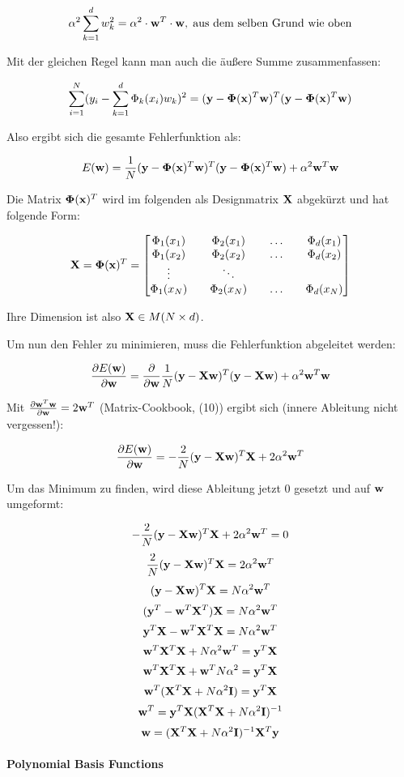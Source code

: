 $$ \alpha^2 \sum_{k=1}^d w_k^2 = \alpha^2 \cdot \mathbf{w}^T \cdot \mathbf{w}, \; \text{aus dem selben Grund wie oben} $$

Mit der gleichen Regel kann man auch die äußere Summe zusammenfassen:

$$ \sum_{i=1}^N (y_i - \sum_{k=1}^{d} \Phi_k(x_i) w_k)^2 = (\mathbf{y} - \mathbf{\Phi}(\mathbf{x})^T \mathbf{w})^T (\mathbf{y} - \mathbf{\Phi}(\mathbf{x})^T \mathbf{w}) $$

Also ergibt sich die gesamte Fehlerfunktion als:

$$ E(\mathbf{w}) = \frac{1}{N} (\mathbf{y} - \mathbf{\Phi}(\mathbf{x})^T \mathbf{w})^T (\mathbf{y} - \mathbf{\Phi}(\mathbf{x})^T \mathbf{w}) + \alpha^2 \mathbf{w}^T \mathbf{w} $$

Die Matrix $ \mathbf{\Phi}(\mathbf{x})^T $ wird im folgenden als Designmatrix $ \mathbf{X} $ abgekürzt und hat folgende Form:

$$ \mathbf{X} = \mathbf{\Phi}(\mathbf{x})^T = \begin{bmatrix} \Phi_1(x_1) && \Phi_2(x_1) && \hdots && \Phi_d(x_1) \\  \Phi_1(x_2) && \Phi_2(x_2) && \hdots && \Phi_d(x_2) \\ \vdots && \ddots \\ \Phi_1(x_N) && \Phi_2(x_N) && \hdots && \Phi_d(x_N) \end{bmatrix} $$

Ihre Dimension ist also $ \mathbf{X} \in M(N \times d) $.

Um nun den Fehler zu minimieren, muss die Fehlerfunktion abgeleitet werden:

$$ \frac{\partial E(\mathbf{w})}{\partial \mathbf{w}} = \frac{\partial}{\partial \mathbf{w}} \frac{1}{N} (\mathbf{y} - \mathbf{X} \mathbf{w})^T (\mathbf{y} - \mathbf{X} \mathbf{w}) + \alpha^2 \mathbf{w}^T \mathbf{w} $$

Mit $ \frac{\partial \mathbf{w}^T \mathbf{w}}{\partial \mathbf{w}} = 2 \mathbf{w}^T $ (Matrix-Cookbook, (10)) ergibt sich (innere Ableitung nicht vergessen!):

$$ \frac{\partial E(\mathbf{w})}{\partial \mathbf{w}} = - \frac{2}{N} (\mathbf{y} - \mathbf{X} \mathbf{w})^T \mathbf{X} + 2 \alpha^2 \mathbf{w}^T $$

Um das Minimum zu finden, wird diese Ableitung jetzt 0 gesetzt und auf $\mathbf{w}$ umgeformt:

$$ - \frac{2}{N} (\mathbf{y} - \mathbf{X} \mathbf{w})^T \mathbf{X} + 2 \alpha^2 \mathbf{w}^T = 0 $$
$$ \frac{2}{N} (\mathbf{y} - \mathbf{X} \mathbf{w})^T \mathbf{X} = 2 \alpha^2 \mathbf{w}^T $$
$$ (\mathbf{y} - \mathbf{X} \mathbf{w})^T \mathbf{X} = N \alpha^2 \mathbf{w}^T $$
$$ (\mathbf{y}^T - \mathbf{w}^T \mathbf{X}^T) \mathbf{X} = N \alpha^2 \mathbf{w}^T $$
$$ \mathbf{y}^T \mathbf{X} - \mathbf{w}^T \mathbf{X}^T \mathbf{X} = N \alpha^2 \mathbf{w}^T $$
$$ \mathbf{w}^T \mathbf{X}^T \mathbf{X} + N \alpha^2 \mathbf{w}^T = \mathbf{y}^T \mathbf{X} $$
$$ \mathbf{w}^T \mathbf{X}^T \mathbf{X} + \mathbf{w}^T N \alpha^2 = \mathbf{y}^T \mathbf{X} $$
$$ \mathbf{w}^T (\mathbf{X}^T \mathbf{X} + N \alpha^2 \mathbf{I}) = \mathbf{y}^T \mathbf{X} $$
$$ \mathbf{w}^T = \mathbf{y}^T \mathbf{X} (\mathbf{X}^T \mathbf{X} + N \alpha^2 \mathbf{I})^{-1} $$
$$ \mathbf{w} = (\mathbf{X}^T \mathbf{X} + N \alpha^2 \mathbf{I})^{-1} \mathbf{X}^T \mathbf{y} $$





\paragraph{Polynomial Basis Functions}


